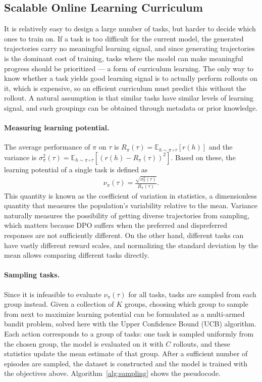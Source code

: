 \documentclass[manuscript,review]{acmart}
\begin{document}
{\subsection{Scalable Online Learning Curriculum}
{
It is relatively easy to design a large number of tasks, but harder to decide which ones
to train on. If a task is too difficult for the current model, the generated trajectories
carry no meaningful learning signal, and since generating trajectories is the dominant
cost of training, tasks where the model can make meaningful progress should be
prioritized --- a form of curriculum learning\cite{bengio2009curriculum}. The only way to
know whether a task yields good learning signal is to actually perform rollouts on it,
which is expensive, so an efficient curriculum must predict this without the rollout. A
natural assumption is that similar tasks have similar levels of learning signal, and such
groupings can be obtained through metadata or prior knowledge.

\paragraph{Measuring learning potential.}{
The average performance of $\pi$ on $\tau$ is
$R_\pi(\tau) = \mathbb{E}_{h \sim \pi \circ \tau }\left[r(h)\right]$ and the variance is
$\sigma^2_\pi(\tau) = \mathbb{E}_{h \sim \pi \circ \tau }\left[(r(h) - R_\pi(\tau))^2\right]$.
Based on these, the learning potential of a single task is defined as
\begin{align}
\label{eq:nu}
    \nu_\pi(\tau) = \frac{\sqrt{\sigma^2_\pi(\tau)}}{R_\pi(\tau)}.
\end{align}
This quantity is known as the coefficient of variation in statistics, a dimensionless
quantity that measures the population's variability relative to the mean. Variance
naturally measures the possibility of getting diverse trajectories from sampling, which
matters because DPO suffers when the preferred and dispreferred responses are not
sufficiently different\cite{pal2024smaugfixingfailuremodes}. On the other hand, different
tasks can have vastly different reward scales, and normalizing the standard deviation
by the mean allows comparing different tasks directly.
}

\paragraph{Sampling tasks.}{
Since it is infeasible to evaluate $\nu_\pi(\tau)$ for all tasks, tasks are sampled from
each group instead. Given a collection of $K$ groups, choosing which group to sample from
next to maximize learning potential can be formulated as a multi-armed bandit problem,
solved here with the Upper Confidence Bound (UCB) algorithm\cite{auer2000using}. Each
action corresponds to a group of tasks: one task is sampled uniformly from the chosen
group, the model is evaluated on it with $C$ rollouts, and these statistics update the
mean estimate of that group. After a sufficient number of episodes are sampled, the
dataset is constructed and the model is trained with the objectives above.
Algorithm~\ref{alg:sampling} shows the pseudocode.
}

}}
\end{document}
